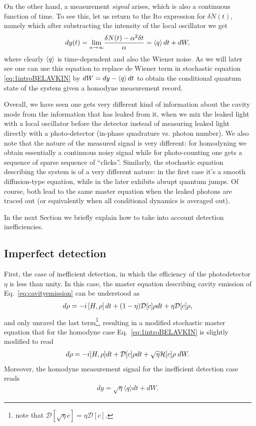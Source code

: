 On the other hand, a measurement \textit{signal} arises, which is also a continuous function of time. To see this, let us return to the Ito expression for $\delta N(t)$, namely
which after substracting the intensity of the local oscillator we get
\begin{equation}
dy(t) = \underset{\alpha \rightarrow \infty}{\text{lim}} \frac{\delta N (t) - \alpha^2\delta t}{\alpha} = \mathinner{\langle q\rangle}dt + dW,
\end{equation}
where clearly $\mathinner{\langle q\rangle}$ is time-dependent and also the Wiener noise. As we will later see one can use this equation to replace de Wiener term in stochastic equation \eqref{eq:1introBELAVKIN} by $dW=dy-\mathinner{\langle q\rangle}dt$ to obtain the conditional quantum state of the system given a homodyne measurement record.

Overall, we have seen one gets very different kind of information about the cavity mode from the information that has leaked from it, when we mix the leaked light with a local oscillator before the detector instead of measuring leaked light directly with a photo-detector (in-phase quadrature vs. photon number). We also note that the nature of the measured signal is very different: for homodyning we obtain essentially a continuous noisy signal while for photo-counting one gets a sequence of sparse sequence of ``clicks''. Similarly, the stochastic equation describing the system is of a very different nature: in the first case it's a smooth diffusion-type equation, while in the later exhibits abrupt quantum jumps. Of course, both lead to the same master equation when the leaked photons are traced out (or equivalently when all conditional dynamics is averaged out).

In the next Section we briefly explain how to take into account detection inefficiencies.

\subsection{Imperfect detection}
First, the case of inefficient detection, in which the efficiency of the photodetector $\eta$ is less than unity. In this case, the master equation describing cavity emission of Eq.~\ref{eq:cavityemission} can be understood as
\begin{align}
d\rho = -i \left[H,\rho\right]dt + (1-\eta)\mathcal{D}[c] \rho dt + \eta \mathcal{D}[ c]\rho,
\end{align}
and only unravel the last term\footnote{note that $\mathcal{D}[\sqrt{\eta} c] = \eta \mathcal{D}[c]$.}, resulting in a modified stochastic master equation that for the homodyne case Eq.~\ref{eq:1introBELAVKIN} is slightly modified to read
\begin{align}\label{eq:inefficientDETECTION}
d\rho = -i[H,\rho]dt + \mathcal{D}[c] \rho dt + \sqrt{\eta} \mathcal{H}[c] \rho \;dW.
\end{align}
Moreover, the homodyne measurement signal for the inefficient detection case reads
\begin{align}\label{eq:1_cmon_ineff_measu}
dy = \sqrt{\eta} \langle q \rangle dt + dW.
\end{align}

